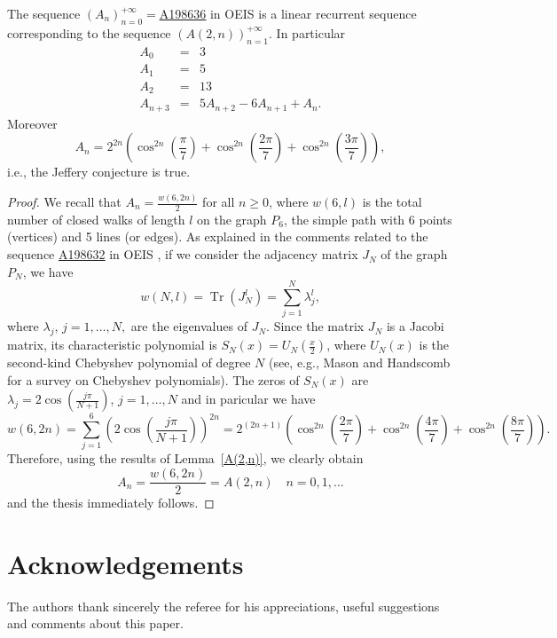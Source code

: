 \documentclass[12pt,reqno]{article}
\newcommand{\seqnum}[1]{\href{http://oeis.org/#1}{\underline{#1}}}
\DeclareMathOperator{\Tr}{Tr}
\begin{document}
\begin{theorem}
The sequence  $(A_n)_{n=0}^{+\infty}=$\seqnum{A198636} in OEIS \cite{oeis} is a linear recurrent sequence corresponding to the sequence $(A(2,n))_{n=1}^{+\infty}$. In particular 
\begin{eqnarray*}
A_0&=&3 \\
A_1&=&5 \\
A_2&=&13 \\
A_{n+3} &=& 5A_{n+2}-6A_{n+1}+A_n.
\end{eqnarray*}
Moreover
$$A_n=2^{2n}\left(\cos^{2n}\left(\frac{\pi}{7}\right)+\cos^{2n}\left(\frac{2\pi}{7}\right)+\cos^{2n}\left(\frac{3\pi}{7}\right)\right),$$
i.e., the Jeffery conjecture is true.
\end{theorem}
\begin{proof}
We recall that $A_n= \frac{w(6,2n)}{2}$ for all $n\geq0$, where $w(6,l)$ is the total number of closed walks of length $l$ on the graph $P_6$, the simple path with 6 points (vertices) and 5 lines (or edges). 
As explained in the comments related to the sequence \seqnum{A198632} in OEIS \cite{oeis}, if we consider the adjacency matrix $J_N$ of the graph $P_N$, we have $$w(N,l)=\Tr(J_N^l)=\sum_{j=1}^{N}\lambda_{j}^{l},$$
where $\lambda_j$, $j=1,\ldots,N,$ are the eigenvalues of $J_N$.
Since the matrix $J_N$ is a Jacobi matrix, its characteristic polynomial is $S_N(x)=U_N(\frac{x}{2})$, where $U_N(x)$ is the second-kind Chebyshev polynomial of degree $N$  
(see, e.g., Mason and Handscomb \cite{Mason} for a survey on Chebyshev polynomials).
The zeros of $S_N(x)$ are $\lambda_j=2\cos\left(\frac{j\pi}{N+1}\right)$, $j=1,\ldots,N$ and in paricular we have
$$ w(6,2n)=\sum_{j=1}^{6}\left(2\cos\left(\frac{j\pi}{N+1}\right)\right)^{2n}=2^{(2n+1)}\left(\cos^{2n}\left(\frac{2\pi}{7}\right)+\cos^{2n}\left(\frac{4\pi}{7}\right)+\cos^{2n}\left(\frac{8\pi}{7}\right)\right).$$
Therefore, using the results of Lemma~\ref{A(2,n)},
we clearly obtain  $$A_n=\frac{w(6,2n)}{2}=A(2,n) \quad n=0,1,\ldots $$ and the thesis immediately follows.
\end{proof}

\section{Acknowledgements}
The authors thank sincerely the referee for his appreciations, useful suggestions and comments about this paper.
\end{document}
